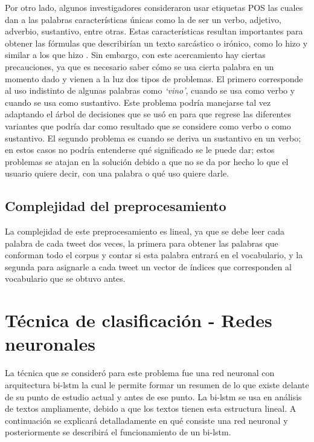 \par Por otro lado, algunos investigadores consideraron usar etiquetas \gls{POS} las cuales dan a las palabras características únicas como la de ser un verbo, adjetivo, adverbio, sustantivo, entre otras. Estas características resultan importantes para obtener las fórmulas que describirían un texto sarcástico o irónico, como lo hizo \textcite{barbieri2014italian} y similar a los que hizo \textcite{davidov2010semi}. Sin embargo, con este acercamiento hay ciertas precauciones, ya que es necesario saber cómo se usa cierta palabra en un momento dado y vienen a la luz dos tipos de problemas. El primero corresponde al uso indistinto de algunas palabras como \textit{`vino'}, cuando se usa como verbo y cuando se usa como sustantivo. Este problema podría manejarse tal vez adaptando el árbol de decisiones que se usó en \textcite{barbieri2014italian} para que regrese las diferentes variantes que podría dar como resultado que se considere como verbo o como sustantivo. El segundo problema es cuando se deriva un sustantivo en un verbo; en estos casos no podría entenderse qué significado se le puede dar; estos problemas se atajan en la solución debido a que no se da por hecho lo que el usuario quiere decir, con una palabra o qué uso quiere darle.


\subsection{Complejidad del preprocesamiento}
La complejidad de este preprocesamiento es lineal, ya que se debe leer cada palabra de cada tweet dos veces, la primera para obtener las palabras que conforman todo el corpus y contar si esta palabra entrará en el vocabulario, y la segunda para asignarle a cada tweet un vector de índices que corresponden al vocabulario que se obtuvo antes.


\section{Técnica de clasificación - Redes neuronales}

\par La técnica que se consideró para este problema fue una red neuronal con arquitectura \gls{bi-lstm} la cual le permite formar un resumen de lo que existe delante de su punto de estudio actual y antes de ese punto. La \gls{bi-lstm} se usa en análisis de textos ampliamente, debido a que los textos tienen esta estructura lineal. A continuación se explicará detalladamente en qué consiste una red neuronal y posteriormente se describirá el funcionamiento de un \gls{bi-lstm}.

